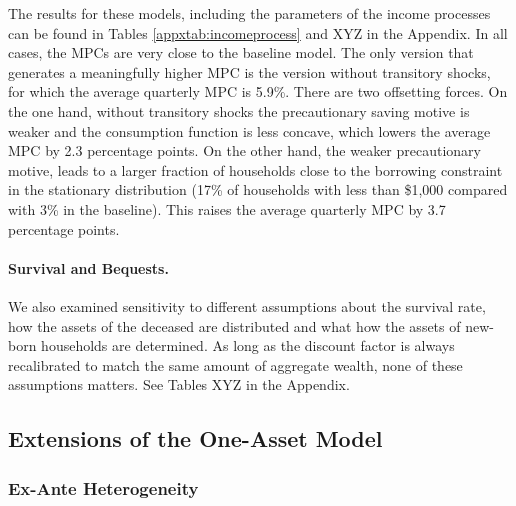The results for these models, including the parameters of the income processes can be found in Tables \ref{appxtab:incomeprocess} and XYZ in the Appendix. In all cases, the MPCs are very close to the baseline model. The only version that generates a meaningfully higher MPC is the version without transitory shocks, for which the average quarterly MPC is 5.9\%. There are two offsetting forces. On the one hand, without transitory shocks the precautionary saving motive is weaker and the consumption function is less concave, which lowers the average MPC by 2.3 percentage points. On the other hand, the weaker precautionary motive, leads to a larger fraction of households close to the borrowing constraint in the stationary distribution (17\% of households with less than \$1,000 compared with 3\% in the baseline). This raises the average quarterly MPC by 3.7 percentage points.

\paragraph{Survival and Bequests.}

We also examined sensitivity to different assumptions about the survival rate, how the assets of the deceased are distributed and what how the assets of new-born households are determined. As long as the discount factor is always recalibrated to match the same amount of aggregate wealth, none of these assumptions matters. See Tables XYZ in the Appendix.

\subsection{Extensions of the One-Asset Model} \label{sec:one_asset_extensions}

%
%
%

\subsubsection{Ex-Ante Heterogeneity}\label{sec:one_asset_heterogeneity}

